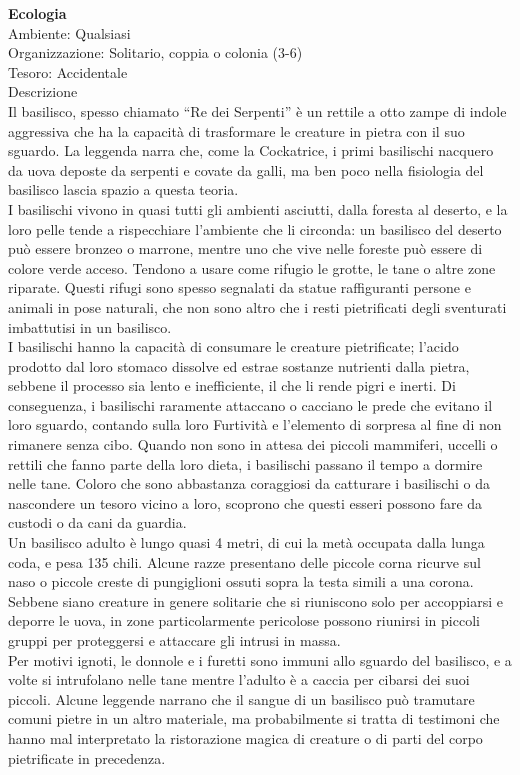 \begin{multicols}{2}
\textbf{Ecologia}\\
Ambiente: Qualsiasi\\
Organizzazione: Solitario, coppia o colonia (3-6)\\
Tesoro: Accidentale\\
Descrizione\\
Il basilisco, spesso chiamato “Re dei Serpenti” è un rettile a otto zampe di indole aggressiva che ha la capacità di trasformare le creature in pietra con il suo sguardo. La leggenda narra che, come la Cockatrice, i primi basilischi nacquero da uova deposte da serpenti e covate da galli, ma ben poco nella fisiologia del basilisco lascia spazio a questa teoria.\\
I basilischi vivono in quasi tutti gli ambienti asciutti, dalla foresta al deserto, e la loro pelle tende a rispecchiare l’ambiente che li circonda: un basilisco del deserto può essere bronzeo o marrone, mentre uno che vive nelle foreste può essere di colore verde acceso. Tendono a usare come rifugio le grotte, le tane o altre zone riparate. Questi rifugi sono spesso segnalati da statue raffiguranti persone e animali in pose naturali, che non sono altro che i resti pietrificati degli sventurati imbattutisi in un basilisco.\\
I basilischi hanno la capacità di consumare le creature pietrificate; l’acido prodotto dal loro stomaco dissolve ed estrae sostanze nutrienti dalla pietra, sebbene il processo sia lento e inefficiente, il che li rende pigri e inerti. Di conseguenza, i basilischi raramente attaccano o cacciano le prede che evitano il loro sguardo, contando sulla loro Furtività e l’elemento di sorpresa al fine di non rimanere senza cibo. Quando non sono in attesa dei piccoli mammiferi, uccelli o rettili che fanno parte della loro dieta, i basilischi passano il tempo a dormire nelle tane. Coloro che sono abbastanza coraggiosi da catturare i basilischi o da nascondere un tesoro vicino a loro, scoprono che questi esseri possono fare da custodi o da cani da guardia.\\
Un basilisco adulto è lungo quasi 4 metri, di cui la metà occupata dalla lunga coda, e pesa 135 chili. Alcune razze presentano delle piccole corna ricurve sul naso o piccole creste di pungiglioni ossuti sopra la testa simili a una corona. Sebbene siano creature in genere solitarie che si riuniscono solo per accoppiarsi e deporre le uova, in zone particolarmente pericolose possono riunirsi in piccoli gruppi per proteggersi e attaccare gli intrusi in massa.\\
Per motivi ignoti, le donnole e i furetti sono immuni allo sguardo del basilisco, e a volte si intrufolano nelle tane mentre l’adulto è a caccia per cibarsi dei suoi piccoli. Alcune leggende narrano che il sangue di un basilisco può tramutare comuni pietre in un altro materiale, ma probabilmente si tratta di testimoni che hanno mal interpretato la ristorazione magica di creature o di parti del corpo pietrificate in precedenza.\\


\end{multicols}
